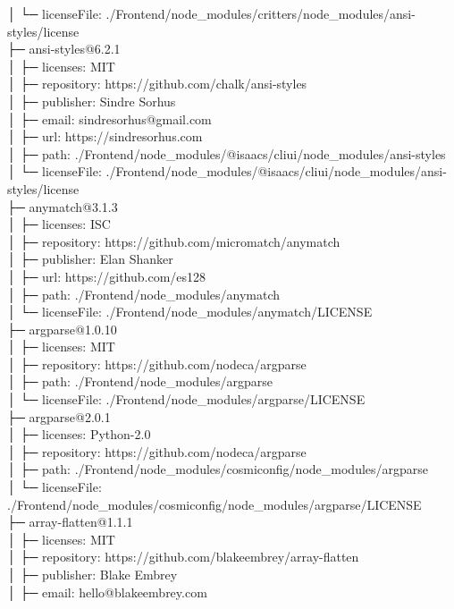 │  └─ licenseFile: ./Frontend/node\_modules/critters/node\_modules/ansi-styles/license\\
├─ ansi-styles@6.2.1\\
│  ├─ licenses: MIT\\
│  ├─ repository: https://github.com/chalk/ansi-styles\\
│  ├─ publisher: Sindre Sorhus\\
│  ├─ email: sindresorhus@gmail.com\\
│  ├─ url: https://sindresorhus.com\\
│  ├─ path: ./Frontend/node\_modules/@isaacs/cliui/node\_modules/ansi-styles\\
│  └─ licenseFile: ./Frontend/node\_modules/@isaacs/cliui/node\_modules/ansi-styles/license\\
├─ anymatch@3.1.3\\
│  ├─ licenses: ISC\\
│  ├─ repository: https://github.com/micromatch/anymatch\\
│  ├─ publisher: Elan Shanker\\
│  ├─ url: https://github.com/es128\\
│  ├─ path: ./Frontend/node\_modules/anymatch\\
│  └─ licenseFile: ./Frontend/node\_modules/anymatch/LICENSE\\
├─ argparse@1.0.10\\
│  ├─ licenses: MIT\\
│  ├─ repository: https://github.com/nodeca/argparse\\
│  ├─ path: ./Frontend/node\_modules/argparse\\
│  └─ licenseFile: ./Frontend/node\_modules/argparse/LICENSE\\
├─ argparse@2.0.1\\
│  ├─ licenses: Python-2.0\\
│  ├─ repository: https://github.com/nodeca/argparse\\
│  ├─ path: ./Frontend/node\_modules/cosmiconfig/node\_modules/argparse\\
│  └─ licenseFile: ./Frontend/node\_modules/cosmiconfig/node\_modules/argparse/LICENSE\\
├─ array-flatten@1.1.1\\
│  ├─ licenses: MIT\\
│  ├─ repository: https://github.com/blakeembrey/array-flatten\\
│  ├─ publisher: Blake Embrey\\
│  ├─ email: hello@blakeembrey.com\\
